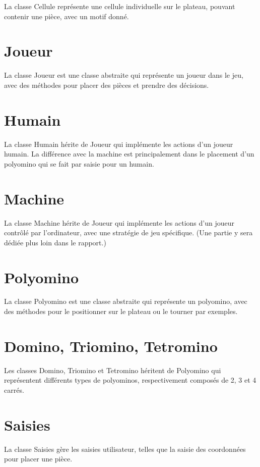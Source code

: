 La classe Cellule représente une cellule individuelle sur le plateau, pouvant contenir une pièce, avec un motif donné.

\section{Joueur}

La classe Joueur est une classe abstraite qui représente un joueur dans le jeu, avec des méthodes pour placer des pièces et prendre des décisions.

\section{Humain}

La classe Humain hérite de Joueur qui implémente les actions d'un joueur humain. La différence avec la machine est principalement dans le placement d'un polyomino qui se fait par saisie pour un humain.

\section{Machine}

La classe Machine hérite de Joueur qui implémente les actions d'un joueur contrôlé par l'ordinateur, avec une stratégie de jeu spécifique. (Une partie y sera dédiée plus loin dans le rapport.)

\newpage
\section{Polyomino}

La classe Polyomino est une classe abstraite qui représente un polyomino, avec des méthodes pour le positionner sur le plateau ou le tourner par exemples.

\section{Domino, Triomino, Tetromino}

Les classes Domino, Triomino et Tetromino héritent de Polyomino qui représentent différents types de polyominos, respectivement composés de 2, 3 et 4 carrés.

\section{Saisies}

La classe Saisies gère les saisies utilisateur, telles que la saisie des coordonnées pour placer une pièce.

